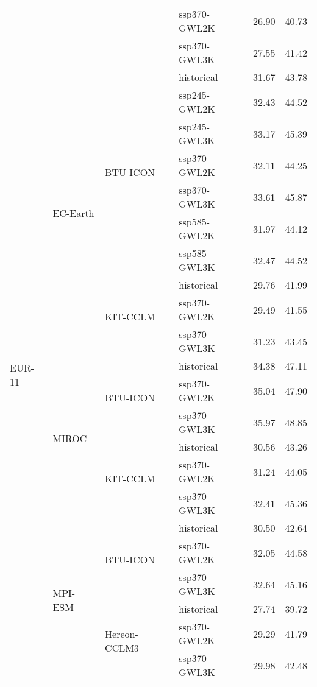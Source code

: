 \begin{table}[!htbp]
\begin{tabular}{lll|l|cc}
 &  &  & ssp370-GWL2K & 26.90 & 40.73 \\
 &  &  & ssp370-GWL3K & 27.55 & 41.42 \\
\midrule
\multirow{22}{*}{EUR-11} & \multirow{10}{*}{EC-Earth} & \multirow{7}{*}{BTU-ICON} & historical & 31.67 & 43.78 \\
 &  &  & ssp245-GWL2K & 32.43 & 44.52 \\
 &  &  & ssp245-GWL3K & 33.17 & 45.39 \\
 &  &  & ssp370-GWL2K & 32.11 & 44.25 \\
 &  &  & ssp370-GWL3K & 33.61 & 45.87 \\
 &  &  & ssp585-GWL2K & 31.97 & 44.12 \\
 &  &  & ssp585-GWL3K & 32.47 & 44.52 \\
\cmidrule(lr){3-6}
 &  & \multirow{3}{*}{KIT-CCLM} & historical & 29.76 & 41.99 \\
 &  &  & ssp370-GWL2K & 29.49 & 41.55 \\
 &  &  & ssp370-GWL3K & 31.23 & 43.45 \\
\cmidrule(lr){3-6}
\cmidrule(lr){2-6}
 & \multirow{6}{*}{MIROC} & \multirow{3}{*}{BTU-ICON} & historical & 34.38 & 47.11 \\
 &  &  & ssp370-GWL2K & 35.04 & 47.90 \\
 &  &  & ssp370-GWL3K & 35.97 & 48.85 \\
\cmidrule(lr){3-6}
 &  & \multirow{3}{*}{KIT-CCLM} & historical & 30.56 & 43.26 \\
 &  &  & ssp370-GWL2K & 31.24 & 44.05 \\
 &  &  & ssp370-GWL3K & 32.41 & 45.36 \\
\cmidrule(lr){3-6}
\cmidrule(lr){2-6}
 & \multirow{6}{*}{MPI-ESM} & \multirow{3}{*}{BTU-ICON} & historical & 30.50 & 42.64 \\
 &  &  & ssp370-GWL2K & 32.05 & 44.58 \\
 &  &  & ssp370-GWL3K & 32.64 & 45.16 \\
\cmidrule(lr){3-6}
 &  & \multirow{3}{*}{Hereon-CCLM3} & historical & 27.74 & 39.72 \\
 &  &  & ssp370-GWL2K & 29.29 & 41.79 \\
 &  &  & ssp370-GWL3K & 29.98 & 42.48 \\
\bottomrule
\end{tabular}
\end{table}
